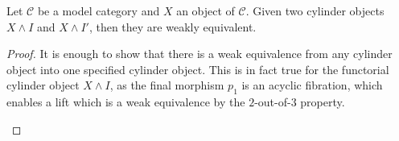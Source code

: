 \documentclass[../thesis.tex]{subfiles}
\begin{document}
            \begin{proposition}
                Let $\mathcal{C}$ be a model category and $X$ an object of $\mathcal{C}$. Given two cylinder objects $X\wedge I$ and $X\wedge I'$, then they are weakly equivalent. 
            \end{proposition}

            \begin{proof}
                It is enough to show that there is a weak equivalence from any cylinder object into one specified cylinder object. This is in fact true for the functorial cylinder object $X\wedge I$, as the final morphism $p_1$ is an acyclic fibration, which enables a lift which is a weak equivalence by the $2$-out-of-$3$ property.

                \begin{center}
                \end{center}
            \end{proof}
\end{document}
